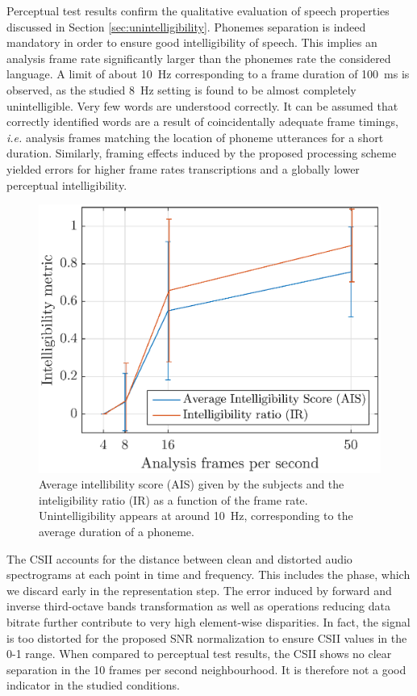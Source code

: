 \documentclass[12pt,times,onecolumn]{article}
\begin{document}
Perceptual test results confirm the qualitative evaluation of speech properties discussed in Section \ref{sec:unintelligibility}. Phonemes separation is indeed mandatory in order to ensure good intelligibility of speech. This implies an analysis frame rate significantly larger than the phonemes rate the considered language. A limit of about 10~Hz corresponding to a frame duration of 100~ms is observed, as the studied 8~Hz setting is found to be almost completely unintelligible. Very few words are understood correctly. It can be assumed that correctly identified words are a result of coincidentally adequate frame timings, \textit{i.e.} analysis frames matching the location of phoneme utterances for a short duration. Similarly, framing effects induced by the proposed processing scheme yielded errors for higher frame rates transcriptions and a globally lower perceptual intelligibility.\\


\begin{figure}[htbp]
	\centering
		\includegraphics[width=0.7\columnwidth]{figures/subj_int.eps}
	\caption{Average intellibility score (AIS) given by the subjects and the inteligibility ratio (IR) as a function of the frame rate. Unintelligibility appears at around 10~Hz, corresponding to the average duration of a phoneme.}
	\label{fig:subj_int}
\end{figure}

The CSII accounts for the distance between clean and distorted audio spectrograms at each point in time and frequency. This includes the phase, which we discard early in the representation step. The error induced by forward and inverse third-octave bands transformation as well as operations reducing data bitrate further contribute to very high element-wise disparities. In fact, the signal is too distorted for the proposed SNR normalization to ensure CSII values in the 0-1 range. When compared to perceptual test results, the CSII shows no clear separation in the 10 frames per second neighbourhood. It is therefore not a good indicator in the studied conditions.\\
\end{document}
